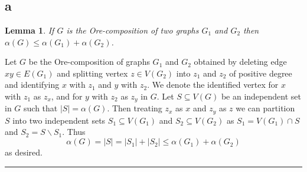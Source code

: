 \documentclass[letterpaper,12pt,oneside,onecolumn]{article}
\newenvironment{proof}{{\bf Proof:  }}{\hfill\rule{2mm}{2mm}}
\newtheorem{lemma}[fact]{Lemma}
\begin{document}
\newpage
\section{}
\subsection{a}
\begin{lemma}
	If $G$ is the Ore-composition of two graphs $G_1$ and $G_2$ then $\alpha(G) \leq \alpha(G_1) + \alpha(G_2)$.
\end{lemma}
\begin{proof}
Let $G$ be the Ore-composition of graphs $G_1$ and $G_2$ obtained by deleting edge $xy \in E(G_1)$ and splitting vertex $z \in V(G_2)$ into $z_1$ and $z_2$ of positive degree and identifying $x$ with $z_1$ and $y$ with $z_2$. We denote the identified vertex for $x$ with $z_1$ as $z_x$, and for $y$ with $z_2$ as $z_y$ in $G$. Let $S \subseteq V(G)$ be an independent set in $G$ such that $|S| = \alpha (G)$. 
Then treating $z_x$ as $x$ and $z_y$ as $z$ we can partition $S$ into two independent sets $S_1\subseteq V(G_1)$ and $S_2\subseteq V(G_2)$ as $S_1 = V(G_1) \cap S$ and $S_2 = S\backslash S_1$. Thus
$$\alpha(G) = |S| = |S_1| + |S_2| \leq \alpha(G_1) + \alpha(G_2)$$
as desired.
\end{proof}
\end{document}
